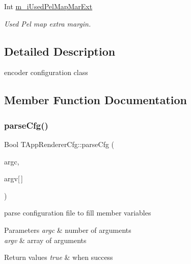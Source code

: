 \begin{DoxyCompactItemize}
\mbox{\label{class_t_app_renderer_cfg_a6041bc2cc5be62d429337f18987716a4}} 
Int \hyperlink{class_t_app_renderer_cfg_a6041bc2cc5be62d429337f18987716a4}{m\+\_\+i\+Used\+Pel\+Map\+Mar\+Ext}
\begin{DoxyCompactList}\small\item\em Used Pel map extra margin. \end{DoxyCompactList}\end{DoxyCompactItemize}


\subsection{Detailed Description}
encoder configuration class 

\subsection{Member Function Documentation}
\mbox{\label{class_t_app_renderer_cfg_a34af17ae3bc4e6a66c4b67b5914dcb51}} 
\subsubsection{\texorpdfstring{parse\+Cfg()}{parseCfg()}}
{\footnotesize\ttfamily Bool T\+App\+Renderer\+Cfg\+::parse\+Cfg (\begin{DoxyParamCaption}\item[{Int}]{argc,  }\item[{T\+Char $\ast$}]{argv\mbox{[}$\,$\mbox{]} }\end{DoxyParamCaption})}



parse configuration file to fill member variables 


\begin{DoxyParams}{Parameters}
{\em argc} & number of arguments \\
\hline
{\em argv} & array of arguments \\
\hline
\end{DoxyParams}

\begin{DoxyRetVals}{Return values}
{\em true} & when success \\
\hline
\end{DoxyRetVals}
\mbox{\label{class_t_app_renderer_cfg_ae527491bfd779c691f53f9d498ca82f0}} 
